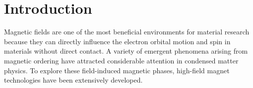 \documentclass[%
 reprint,
superscriptaddress,
 amsmath,amssymb,
 aps,
floatfix,
]{revtex4-2}
\begin{document}
\author{Masao~Watanabe}

\author{Taro~Nakajima}

\author{Yoshimitsu~Kohama}


\date{\today}

\begin{abstract}
\end{abstract}


\maketitle

\section{Introduction}

Magnetic fields are one of the most beneficial environments for material research because they can directly influence the electron orbital motion and spin in materials without direct contact.
A variety of emergent phenomena arising from magnetic ordering have attracted considerable attention in condensed matter physics.
To explore these field-induced magnetic phases, high-field magnet technologies have been extensively developed.
\end{document}
